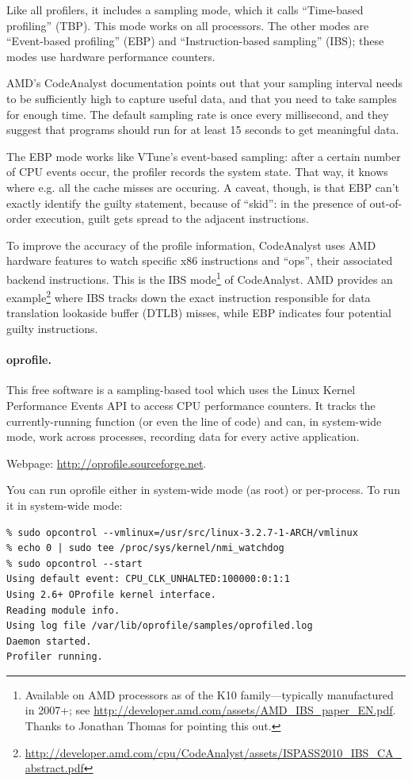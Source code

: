 \documentclass[11pt]{article}
\begin{document}
Like all profilers, it includes a sampling mode, which it calls ``Time-based
profiling'' (TBP). This mode works on all processors. The other modes are 
``Event-based profiling'' (EBP) and ``Instruction-based sampling'' (IBS);
these modes use hardware performance counters.

AMD's CodeAnalyst documentation points out that your sampling interval
needs to be sufficiently high to capture useful data, and that you need to 
take samples for enough time. The default sampling rate is once every
millisecond, and they suggest that programs should run for at least 15 seconds
to get meaningful data.

The EBP mode works like VTune's event-based sampling: after a certain
number of CPU events occur, the profiler records the system state.
That way, it knows where e.g. all the cache misses are occuring.
A caveat, though, is that EBP can't exactly identify the guilty statement,
because of ``skid'': in the presence of out-of-order execution, guilt
gets spread to the adjacent instructions.

To improve the accuracy of the profile information, CodeAnalyst uses
AMD hardware features to watch specific x86 instructions and ``ops'',
their associated backend instructions. This is the IBS mode\footnote{Available
on AMD processors as of the K10 family---typically manufactured in 2007+; see \url{http://developer.amd.com/assets/AMD_IBS_paper_EN.pdf}. Thanks to Jonathan Thomas for pointing this out.} of
CodeAnalyst.  AMD provides an
example\footnote{\url{http://developer.amd.com/cpu/CodeAnalyst/assets/ISPASS2010_IBS_CA_abstract.pdf}}
where IBS tracks down the exact instruction responsible for data
translation lookaside buffer (DTLB) misses, while EBP indicates four
potential guilty instructions.


\paragraph{oprofile.} This free software is a sampling-based tool which uses the Linux Kernel Performance
Events API to access CPU performance counters. It tracks the
currently-running function (or even the line of code) and can, in
system-wide mode, work across processes, recording data for every
active application.

Webpage: \url{http://oprofile.sourceforge.net}.

You can run oprofile either in system-wide mode (as root) or per-process. To run it in system-wide mode:
  \begin{lstlisting}
% sudo opcontrol --vmlinux=/usr/src/linux-3.2.7-1-ARCH/vmlinux
% echo 0 | sudo tee /proc/sys/kernel/nmi_watchdog
% sudo opcontrol --start
Using default event: CPU_CLK_UNHALTED:100000:0:1:1
Using 2.6+ OProfile kernel interface.
Reading module info.
Using log file /var/lib/oprofile/samples/oprofiled.log
Daemon started.
Profiler running.
  \end{lstlisting}
\end{document}
